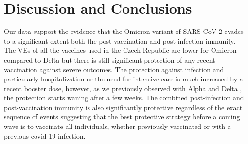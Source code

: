 \documentclass[preprint,12pt,authoryear]{elsarticle}
\begin{document}



\section{Discussion and Conclusions}
\label{sec4}

Our data support the evidence that the Omicron variant of SARS-CoV-2 evades to a significant extent both the post-vaccination and post-infection immunity. The VEs of all the vaccines used in the Czech Republic are lower for Omicron compared to Delta but there is still significant protection of any recent vaccination against severe outcomes. The protection against infection and particularly hospitalization or the need for intensive care is much increased by a recent booster dose, however, as we previously observed with Alpha and Delta \citep{Berec2021preprint}, the protection starts waning after a few weeks. The combined post-infection and post-vaccination immunity is also significantly protective regardless of the exact sequence of events suggesting that the best protective strategy before a coming wave is to vaccinate all individuals, whether previously vaccinated or with a previous covid-19 infection.
\end{document}
